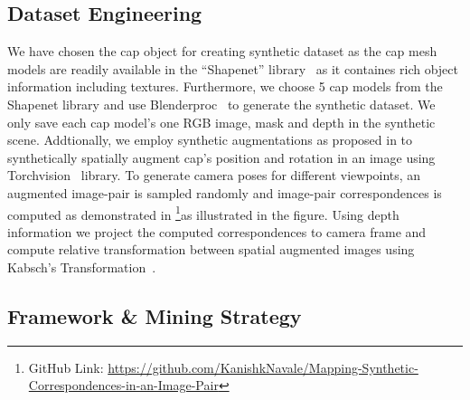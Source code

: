 \subsection{Dataset Engineering}

We have chosen the cap object for creating synthetic dataset as the cap mesh models are readily available in the ``Shapenet'' library~\cite{chang2015shapenet}
as it containes rich object information including textures. Furthermore, we choose 5 cap models from the Shapenet library and use
Blenderproc~\cite{blenderproc} to generate the synthetic dataset.
We only save each cap model's one RGB image, mask and depth in the synthetic scene. Addtionally, we employ synthetic augmentations as proposed in \cite{adrian2022efficient}
to synthetically spatially augment cap's position and rotation in an image using Torchvision~\cite{marcel2010torchvision} library. To generate camera poses for different viewpoints,
an augmented image-pair is sampled randomly and image-pair correspondences is computed as demonstrated in \cite{adrian2022efficient}
\footnote[1]{GitHub Link: \url{https://github.com/KanishkNavale/Mapping-Synthetic-Correspondences-in-an-Image-Pair}}as illustrated in the figure.
Using depth information we project the computed correspondences to camera frame and compute relative transformation between spatial augmented images
using Kabsch's Transformation~\cite{kabsch}.

\subsection{Framework \& Mining Strategy}

